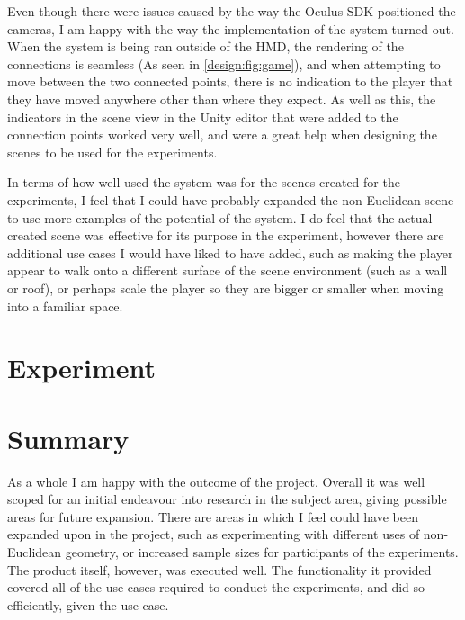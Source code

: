 		Even though there were issues caused by the way the Oculus SDK positioned the cameras, I am happy with the way the implementation of the system turned out.
		When the system is being ran outside of the HMD, the rendering of the connections is seamless (As seen in \autoref{design:fig:game}), and when attempting to move between the two connected points, there is no indication to the player that they have moved anywhere other than where they expect.
		As well as this, the indicators in the scene view in the Unity editor that were added to the connection points worked very well, and were a great help when designing the scenes to be used for the experiments.

		In terms of how well used the system was for the scenes created for the experiments, I feel that I could have probably expanded the non-Euclidean scene to use more examples of the potential of the system.
		I do feel that the actual created scene was effective for its purpose in the experiment, however there are additional use cases I would have liked to have added, such as making the player appear to walk onto a different surface of the scene environment (such as a wall or roof), or perhaps scale the player so they are bigger or smaller when moving into a familiar space. %

	\section{Experiment}

		


		



	\section{Summary}

		As a whole I am happy with the outcome of the project.
		Overall it was well scoped for an initial endeavour into research in the subject area, giving possible areas for future expansion.
		There are areas in which I feel could have been expanded upon in the project, such as experimenting with different uses of non-Euclidean geometry, or increased sample sizes for participants of the experiments.
		The product itself, however, was executed well.
		The functionality it provided covered all of the use cases required to conduct the experiments, and did so efficiently, given the use case.

